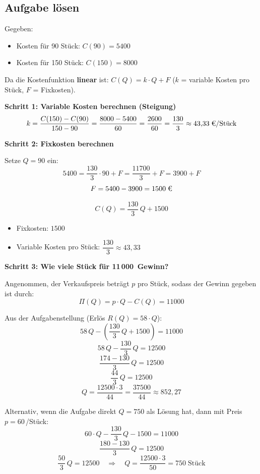 \documentclass[12pt,a4paper]{article}
\begin{document}
\subsection{Aufgabe l\"osen}

Gegeben:
\begin{itemize}
  \item Kosten f\"ur 90 St\"uck: $C(90) = 5400$\,\texteuro{}
  \item Kosten f\"ur 150 St\"uck: $C(150) = 8000$\,\texteuro{}
\end{itemize}

Da die Kostenfunktion \textbf{linear} ist: $C(Q) = k \cdot Q + F$ \quad ($k$ = variable Kosten pro St\"uck, $F$ = Fixkosten).

\textbf{Schritt 1: Variable Kosten berechnen (Steigung)}
\[
  k = \frac{C(150) - C(90)}{150 - 90} = \frac{8000 - 5400}{60} = \frac{2600}{60} = \frac{130}{3} \approx 43{,}33\;\text{\texteuro{}/St\"uck}
\]

\textbf{Schritt 2: Fixkosten berechnen}

Setze $Q = 90$ ein:
\[
  5400 = \frac{130}{3} \cdot 90 + F = \frac{11700}{3} + F = 3900 + F
\]
\[
  F = 5400 - 3900 = 1500\;\text{\texteuro{}}
\]

\begin{merkbox}[title={Kostenfunktion}]
\[
  C(Q) = \frac{130}{3}\,Q + 1500
\]
\begin{itemize}
  \item Fixkosten: $1500$\,\texteuro{}
  \item Variable Kosten pro St\"uck: $\dfrac{130}{3} \approx 43{,}33$\,\texteuro{}
\end{itemize}
\end{merkbox}

\textbf{Schritt 3: Wie viele St\"uck f\"ur 11\,000\,\texteuro{} Gewinn?}

Angenommen, der Verk\-aufspreis betr\"agt $p$ pro St\"uck, sodass der Gewinn gegeben ist durch:
\[
  \Pi(Q) = p \cdot Q - C(Q) = 11000
\]

Aus der Aufgabenstellung (Erl\"os $R(Q) = 58 \cdot Q$):
\[
  58\,Q - \left(\frac{130}{3}\,Q + 1500\right) = 11000
\]
\[
  58\,Q - \frac{130}{3}\,Q = 12500
\]
\[
  \frac{174 - 130}{3}\,Q = 12500
\]
\[
  \frac{44}{3}\,Q = 12500
\]
\[
  Q = \frac{12500 \cdot 3}{44} = \frac{37500}{44} \approx 852{,}27
\]

Alternativ, wenn die Aufgabe direkt $Q = 750$ als L\"osung hat, dann mit Preis $p = 60$\,\texteuro{}/St\"uck:
\[
  60 \cdot Q - \frac{130}{3}\,Q - 1500 = 11000
\]
\[
  \frac{180 - 130}{3}\,Q = 12500
\]
\[
  \frac{50}{3}\,Q = 12500 \quad\Longrightarrow\quad Q = \frac{12500 \cdot 3}{50} = 750\;\text{St\"uck}
\]
\end{document}
